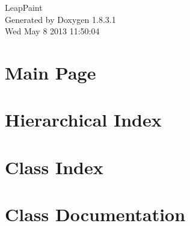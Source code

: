 \documentclass{book}
\begin{document}
\hypersetup{pageanchor=false,citecolor=blue}
\begin{titlepage}
\vspace*{7cm}
\begin{center}
{\Large Leap\-Paint }\\
\vspace*{1cm}
{\large Generated by Doxygen 1.8.3.1}\\
\vspace*{0.5cm}
{\small Wed May 8 2013 11:50:04}\\
\end{center}
\end{titlepage}
\clearemptydoublepage
{}
\tableofcontents
\clearemptydoublepage
{}
\hypersetup{pageanchor=true,citecolor=blue}
\chapter{Main Page}
\label{index}\hypertarget{index}{}
\chapter{Hierarchical Index}

\chapter{Class Index}

\chapter{Class Documentation}





























\printindex
\end{document}
